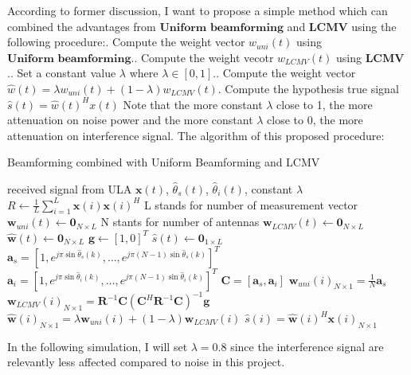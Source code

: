 \documentclass[11pt]{article}
\begin{document}
According to former discussion, I want to propose a simple method which can combined the advantages from $\textbf{Uniform beamforming}$ and $\textbf{LCMV}$ using the following procedure:. Compute the weight vector $w_{uni}(t)$ using $\textbf{Uniform beamforming}$.. Compute the weight vecotr $w_{LCMV}(t)$ using $\textbf{LCMV}$.. Set a constant value $\lambda$ where $\lambda \in [0,1]$.. Compute the weight vector $\hat{w}(t) = \lambda w_{uni}(t) + (1-\lambda)w_{LCMV}(t)$. Compute the hypothesis true signal $\hat{s}(t) = \hat{w}(t)^H x(t)$\newline
Note that the more constant $\lambda$ close to 1, the more attenuation on noise power and the more constant $\lambda$ close to 0, the more attenuation on interference signal.\newline
The algorithm of this proposed procedure:\newpage
\begin{algorithm}
    \caption{Beamforming combined with Uniform Beamforming and LCMV}\label{alg:cap}
    \begin{algorithmic}
    \Require received signal from ULA $\textbf{x}(t)$, $\hat{\theta}_s(t)$, $\hat{\theta}_i(t)$, constant $\lambda$
    \State $R \gets \frac{1}{L} \sum_{i=1}^{L}\textbf{x}(i) \textbf{x}(i)^H$ \Comment L stands for number of measurement vector
    \State $\textbf{w}_{uni}(t) \gets \textbf{0}_{N \times L}$  \Comment N stants for number of antennas
    \State $\textbf{w}_{LCMV}(t) \gets \textbf{0}_{N \times L}$
    \State $\hat{\textbf{w}}(t) \gets \textbf{0}_{N \times L}$
    \State $\textbf{g} \gets [1, 0]^T$
    \State $\hat{s}(t) \gets \textbf{0}_{1\times L}$
        \State $\textbf{a}_s = [1, e^{j\pi\sin{\hat{\theta}_s(k)}},\dots,e^{j\pi (N-1) \sin{\hat{\theta}_s(k)}}]^T$
        \State $\textbf{a}_i = [1, e^{j\pi\sin{\hat{\theta}_i(k)}},\dots,e^{j\pi (N-1) \sin{\hat{\theta}_i(k)}}]^T$ 
        \State $\textbf{C} = [\textbf{a}_s, \textbf{a}_i]$
        \State $\textbf{w}_{uni}(i)_{N\times 1} = \frac{1}{N} \textbf{a}_s$
        \State $\textbf{w}_{LCMV}(i)_{N\times 1} = \textbf{R}^{-1} \textbf{C} (\textbf{C}^H \textbf{R}^{-1} \textbf{C})^{-1} \textbf{g}$
        \State $\hat{\textbf{w}}(i)_{N\times 1} = \lambda \textbf{w}_{uni}(i) + (1 - \lambda) \textbf{w}_{LCMV}(i)$
        \State $\hat{s}(i) = \hat{\textbf{w}}(i)^H \textbf{x}(i)_{N \times 1}$
    \EndFor
    \end{algorithmic}
\end{algorithm}
In the following simulation, I will set $\lambda = 0.8$ since the interference signal are relevantly less affected compared to noise in this project.\newline
\end{document}
